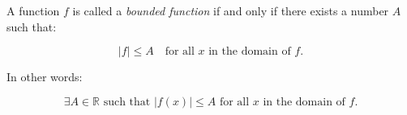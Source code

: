 \documentclass{article}
\begin{document}
A function $f$ is called a \emph{bounded function} if and only if there exists a number $A$ such that:

\[
|f| \leq A \quad \text{for all } x \text{ in the domain of } f.
\]

In other words:

\[
\exists A \in \mathbb{R} \text{ such that } |f(x)| \leq A \text{ for all } x \text{ in the domain of } f.
\]
\end{document}
